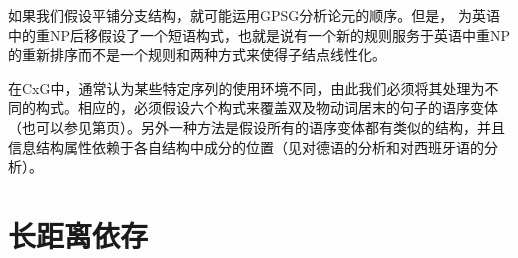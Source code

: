 如果我们假设平铺分支结构，就可能运用GPSG分析\indexgpsgc 论元的顺序。但是， \citet{Kay2002a}为英语中的重NP后移假设了一个短语构式，也就是说有一个新的规则服务于英语中重NP的重新排序而不是一个规则和两种方式来使得子结点线性化。

在CxG中，通常认为某些特定序列的使用环境不同，由此我们必须将其处理为不同的构式。相应的，必须假设六个构式来覆盖双及物动词居末的句子的语序变体（也可以参见第\pageref{Regeln-PSG-Abfolge}页）。另外一种方法是假设所有的语序变体都有类似的结构，并且信息结构属性依赖于各自结构中成分的位置（见\citet{deKuthy2000a}对德语的分析和\citet{Bildhauer2008a}对西班牙语的分析）。

\section{长距离依存}

